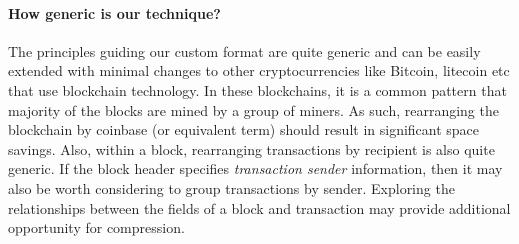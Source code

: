 \paragraph{How generic is our technique?}

The principles guiding our custom format are quite generic and can be easily
extended with minimal changes to other cryptocurrencies like Bitcoin, litecoin etc that use blockchain technology. 
In these blockchains, it is a common pattern that majority of the blocks are mined by a group of miners. As such, rearranging the blockchain by coinbase (or equivalent term) should result in significant space savings.
Also, within a block, rearranging transactions by recipient is also 
quite generic.
If the block header specifies \emph{transaction sender} information, then
it may also be worth considering to group transactions by sender.
Exploring the relationships between the fields of a block and transaction
may provide additional opportunity for compression. 
